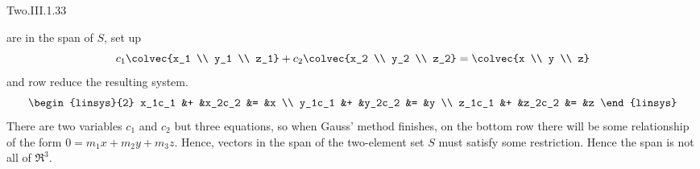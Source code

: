 \begin{ans}{Two.III.1.33}
\begin{exparts}
           are in the span of $S$, set up
           \begin{equation*}
             c_1\colvec{x_1 \\ y_1 \\ z_1}
             +c_2\colvec{x_2 \\ y_2 \\ z_2}
             =\colvec{x \\ y \\ z}
           \end{equation*}
           and row reduce the resulting system.
           \begin{equation*}
             \begin{linsys}{2}
                x_1c_1  &+  &x_2c_2   &=  &x \\
                y_1c_1  &+  &y_2c_2   &=  &y \\
                z_1c_1  &+  &z_2c_2   &=  &z
             \end{linsys}
           \end{equation*}
           There are two
           variables $c_1$ and $c_2$ but three equations, so
           when Gauss' method finishes, on the bottom
           row there will be some relationship of the form
           $0=m_1x+m_2y+m_3z$.
           Hence, vectors in the span of the two-element set $S$
           must satisfy some restriction.
           Hence the span is not all of $\Re^3$.
       \end{exparts}
    
\end{ans}
